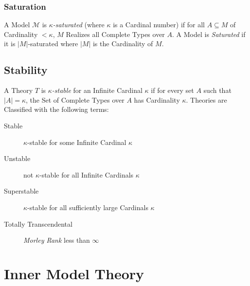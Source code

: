 \subsubsection{Saturation}\label{sec:model_saturation}

A Model $\mathcal{M}$ is \emph{$\kappa$-saturated} (where $\kappa$ is
a Cardinal number) if for all $A \subseteq M$ of Cardinality $<
\kappa$, $M$ Realizes all Complete Types over $A$. A Model is
\emph{Saturated} if it is $|M|$-saturated where $|M|$ is the
Cardinality of $M$.



\subsection{Stability}\label{sec:model_stability}

A Theory $T$ is \emph{$\kappa$-stable} for an Infinite Cardinal $\kappa$
if for every set $A$ such that $|A| = \kappa$, the Set of Complete
Types over $A$ has Cardinality $\kappa$. Theories are Classified with
the following terms:
\begin{description}
\item [Stable] $\kappa$-stable for some Infinite Cardinal $\kappa$
\item [Unstable] not $\kappa$-stable for all Infinite Cardinals $\kappa$
\item [Superstable] $\kappa$-stable for all sufficiently large
  Cardinals $\kappa$
\item [Totally Transcendental] \emph{Morley Rank}\cite{morley65} less
  than $\infty$
\end{description}



\section{Inner Model Theory}\label{sec:inner_model_theory}
